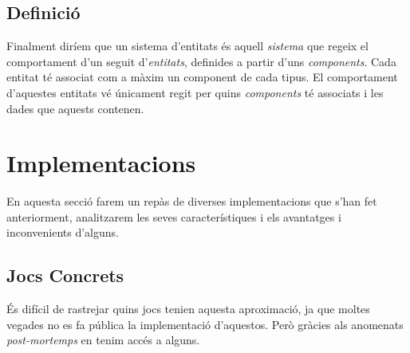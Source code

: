 \subsection{Definició}

Finalment diríem que un sistema d'entitats és aquell {\em sistema} que regeix el comportament d'un seguit d'{\em entitats}, definides a partir d'uns {\em components}. Cada entitat té associat com a màxim un component de cada tipus. El comportament d'aquestes entitats vé únicament regit per quins {\em components} té associats i les dades que aquests contenen.

\section{Implementacions}

En aquesta secció farem un repàs de diverses implementacions que s'han fet anteriorment, analitzarem les seves característiques i els avantatges i inconvenients d'alguns.

\subsection{Jocs Concrets}

És difícil de rastrejar quins jocs tenien aquesta aproximació, ja que moltes vegades no es fa pública la implementació d'aquestos. Però gràcies als anomenats {\em post-mortemps} en tenim accés a alguns.

